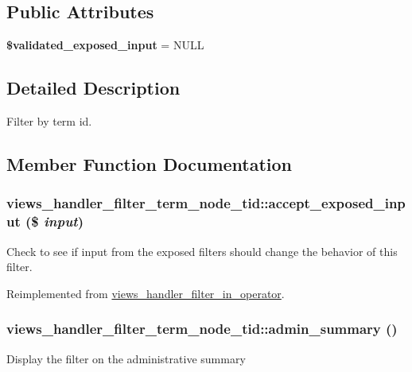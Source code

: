 \subsection*{Public Attributes}
\begin{DoxyCompactItemize}
\item 
\hypertarget{classviews__handler__filter__term__node__tid_af88458bcb86955ba16432e9d6a1c307a}{
{\bfseries \$validated\_\-exposed\_\-input} = NULL}
\label{classviews__handler__filter__term__node__tid_af88458bcb86955ba16432e9d6a1c307a}

\end{DoxyCompactItemize}


\subsection{Detailed Description}
Filter by term id. 

\subsection{Member Function Documentation}
\hypertarget{classviews__handler__filter__term__node__tid_a75f38674ff356981f6e77f009da2101a}{
\subsubsection[{accept\_\-exposed\_\-input}]{\setlength{\rightskip}{0pt plus 5cm}views\_\-handler\_\-filter\_\-term\_\-node\_\-tid::accept\_\-exposed\_\-input (\$ {\em input})}}
\label{classviews__handler__filter__term__node__tid_a75f38674ff356981f6e77f009da2101a}
Check to see if input from the exposed filters should change the behavior of this filter. 

Reimplemented from \hyperlink{classviews__handler__filter__in__operator_aff2b25941729b9ca81e1e53bb8e95a96}{views\_\-handler\_\-filter\_\-in\_\-operator}.\hypertarget{classviews__handler__filter__term__node__tid_a392046588b13b1b76223eb22ba4ff660}{
\subsubsection[{admin\_\-summary}]{\setlength{\rightskip}{0pt plus 5cm}views\_\-handler\_\-filter\_\-term\_\-node\_\-tid::admin\_\-summary ()}}
\label{classviews__handler__filter__term__node__tid_a392046588b13b1b76223eb22ba4ff660}
Display the filter on the administrative summary 

